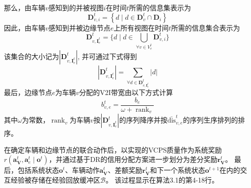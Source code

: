 那么，由车辆$v$感知到的并被视图$i$在时间$t$所需的信息集表示为 
\begin{equation}
	\mathbf{D}_{v, i}^{t} = \left\{ d \mid  d \in \mathbf{D}_{v}^t \cap  \mathbf{D}_i \right\}
\end{equation}
因此，由车辆$v$感知到并被边缘节点$e$上所有视图在时间$t$所需的信息集合表示为 
\begin{equation}
	\mathbf{D}_{v, {\mathbf{I}_e^t}}^{t} = \{ d \mid  d \in \bigcup_{\forall v \in V_e^t} \mathbf{D}_{v, i}^{t}\}
\end{equation}
\noindent 该集合的大小记为$|\mathbf{D}_{v, {\mathbf{I}_e^t}}^{t}|$, 并可通过下式得到
\begin{equation}
	|\mathbf{D}_{v, {\mathbf{I}_e^t}}^{t}| = \sum_{\forall d \in \mathbf{D}_{v, {\mathbf{I}_e^t}}^{t}}|d|
\end{equation}
最后，边缘节点$e$为车辆$v$分配的V2I带宽由以下方式计算 
\begin{equation}
	b_{v, e}^{t} =\frac{b_{e}} {\omega+\operatorname{rank}_{v}}
\end{equation}
\noindent 其中$\omega$为常数，$\operatorname{rank}_{v}$为车辆$v$按$| \mathbf{D}_{v, {\mathbf{I}_e^t}}^{t}|$的序列降序并按$\operatorname{\bar{dis}}_{v, e}^{t}$的序列生序排列的排序。

在确定车辆和边缘节点的联合动作后，以实现的VCPS质量作为系统奖励$r\left(\boldsymbol{a}_{\mathbf{V}}^{t},\boldsymbol{a}_{e}^{t} \mid \boldsymbol{o}^{t}\right)$，并通过基于DR的信用分配方案进一步划分为差分奖励$\boldsymbol{r}_{\mathbf{V}}^{t}$。
最后，包括系统状态$\boldsymbol{o}^{t}$、车辆动作$\boldsymbol{a}_{\mathbf{V}}^{t}$、差额奖励$\boldsymbol{r}_{\mathbf{V}}^{t}$和下一个系统状态$\boldsymbol{o}^{t+1}$在内的交互经验被存储在经验回放缓冲区$\mathcal{B}$。
该过程显示在算法3.1的第4-18行。

